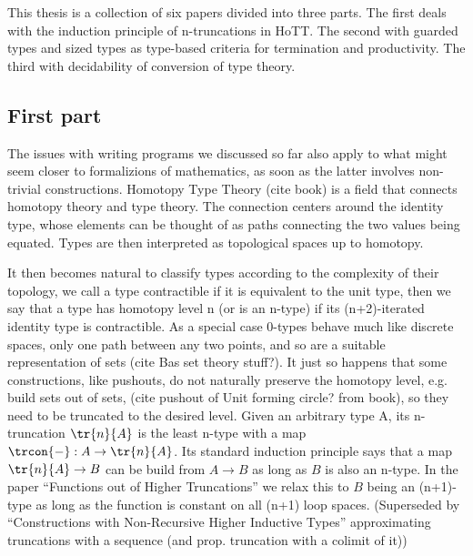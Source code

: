 This thesis is a collection of six papers divided into three parts.
The first deals with the induction principle of n-truncations in HoTT.
The second with guarded types and sized types as type-based criteria
for termination and productivity. The third with decidability of
conversion of type theory.

\subsection{First part}
The issues with writing programs we discussed so far also apply to
what might seem closer to formalizions of mathematics, as soon as the
latter involves non-trivial constructions.
Homotopy Type Theory (cite book) is a field that connects homotopy theory and type theory.
The connection centers around the identity type, whose elements can be
thought of as paths connecting the two values being equated. Types are
then interpreted as topological spaces up to homotopy.

It then becomes natural to classify types according to the complexity
of their topology, we call a type contractible if it is equivalent to
the unit type, then we say that a type has homotopy level n (or is an
n-type) if its (n+2)-iterated identity type is contractible. As a
special case 0-types behave much like discrete spaces, only one path
between any two points, and so are a suitable representation of sets (cite Bas set theory stuff?).
It just so happens that some constructions, like pushouts, do not
naturally preserve the homotopy level, e.g. build sets out of sets, (cite
pushout of Unit forming circle? from book), so they need to be
truncated to the desired level.
Given an arbitrary type A, its n-truncation $\tr{n}{A}$ is the least
n-type with a map $\trcon{-} : A \to \tr{n}{A}$.  Its standard
induction principle says that a map $\tr{n}{A} \to B$ can be build
from $A \to B$ as long as $B$ is also an n-type.
In the paper ``Functions out of Higher Truncations'' we relax this to
$B$ being an (n+1)-type as long as the function is constant on all (n+1) loop spaces.
(Superseded by ``Constructions with Non-Recursive Higher Inductive
Types'' approximating truncations with a sequence (and
prop. truncation with a colimit of it))

